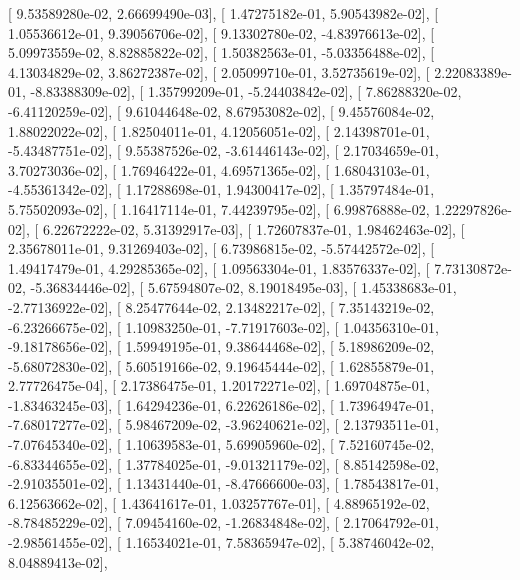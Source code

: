 \documentclass{article}
\begin{document}
       [  9.53589280e-02,   2.66699490e-03],
       [  1.47275182e-01,   5.90543982e-02],
       [  1.05536612e-01,   9.39056706e-02],
       [  9.13302780e-02,  -4.83976613e-02],
       [  5.09973559e-02,   8.82885822e-02],
       [  1.50382563e-01,  -5.03356488e-02],
       [  4.13034829e-02,   3.86272387e-02],
       [  2.05099710e-01,   3.52735619e-02],
       [  2.22083389e-01,  -8.83388309e-02],
       [  1.35799209e-01,  -5.24403842e-02],
       [  7.86288320e-02,  -6.41120259e-02],
       [  9.61044648e-02,   8.67953082e-02],
       [  9.45576084e-02,   1.88022022e-02],
       [  1.82504011e-01,   4.12056051e-02],
       [  2.14398701e-01,  -5.43487751e-02],
       [  9.55387526e-02,  -3.61446143e-02],
       [  2.17034659e-01,   3.70273036e-02],
       [  1.76946422e-01,   4.69571365e-02],
       [  1.68043103e-01,  -4.55361342e-02],
       [  1.17288698e-01,   1.94300417e-02],
       [  1.35797484e-01,   5.75502093e-02],
       [  1.16417114e-01,   7.44239795e-02],
       [  6.99876888e-02,   1.22297826e-02],
       [  6.22672222e-02,   5.31392917e-03],
       [  1.72607837e-01,   1.98462463e-02],
       [  2.35678011e-01,   9.31269403e-02],
       [  6.73986815e-02,  -5.57442572e-02],
       [  1.49417479e-01,   4.29285365e-02],
       [  1.09563304e-01,   1.83576337e-02],
       [  7.73130872e-02,  -5.36834446e-02],
       [  5.67594807e-02,   8.19018495e-03],
       [  1.45338683e-01,  -2.77136922e-02],
       [  8.25477644e-02,   2.13482217e-02],
       [  7.35143219e-02,  -6.23266675e-02],
       [  1.10983250e-01,  -7.71917603e-02],
       [  1.04356310e-01,  -9.18178656e-02],
       [  1.59949195e-01,   9.38644468e-02],
       [  5.18986209e-02,  -5.68072830e-02],
       [  5.60519166e-02,   9.19645444e-02],
       [  1.62855879e-01,   2.77726475e-04],
       [  2.17386475e-01,   1.20172271e-02],
       [  1.69704875e-01,  -1.83463245e-03],
       [  1.64294236e-01,   6.22626186e-02],
       [  1.73964947e-01,  -7.68017277e-02],
       [  5.98467209e-02,  -3.96240621e-02],
       [  2.13793511e-01,  -7.07645340e-02],
       [  1.10639583e-01,   5.69905960e-02],
       [  7.52160745e-02,  -6.83344655e-02],
       [  1.37784025e-01,  -9.01321179e-02],
       [  8.85142598e-02,  -2.91035501e-02],
       [  1.13431440e-01,  -8.47666600e-03],
       [  1.78543817e-01,   6.12563662e-02],
       [  1.43641617e-01,   1.03257767e-01],
       [  4.88965192e-02,  -8.78485229e-02],
       [  7.09454160e-02,  -1.26834848e-02],
       [  2.17064792e-01,  -2.98561455e-02],
       [  1.16534021e-01,   7.58365947e-02],
       [  5.38746042e-02,   8.04889413e-02],
\end{document}
